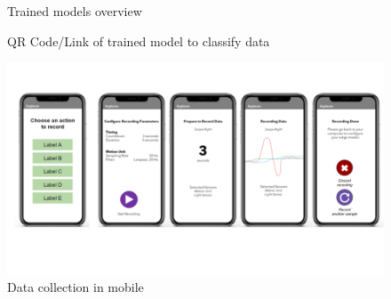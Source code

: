 \begin{figure}[h]
    \centering
    \caption{Trained models overview}
    \label{fig:models-overview}
\end{figure}

\begin{figure}[h]
    \centering
    \caption{QR Code/Link of trained model to classify data}
    \label{fig:model-link}
\end{figure}

\begin{figure}[h]
    \centering
    \includegraphics[width = \textwidth]{mockups/9.png}
    \caption{Data collection in mobile}
    \label{fig:mobile}
\end{figure}